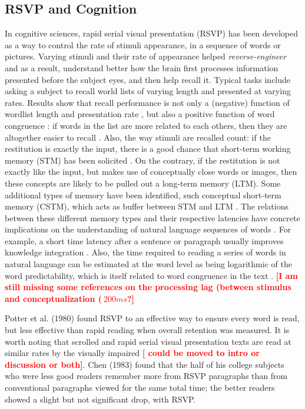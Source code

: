\subsection{RSVP and Cognition}
In cognitive sciences, rapid serial visual presentation (RSVP) has been developed as a way to control the rate of stimuli appearance, in a sequence of words or pictures. Varying stimuli and their rate of appearance helped {\it reverse-engineer} and as a result, understand better how the brain first processes information presented before the subject eyes, and then help recall it. Typical tasks include asking a subject to recall world lists of varying length and presented at varying rates. Results show that recall performance is not only a (negative) function of wordlist length and presentation rate \cite{}, but also a positive function of word congruence \cite{}: if words in the list are more related to each others, then they are altogether easier to recall \cite{}. Also, the way stimuli are recalled count: if the restitution is exactly the input, there is a good chance that  short-term working memory (STM) has been solicited \cite{}. On the contrary, if the restitution is not exactly like the input, but makes use of conceptually close words or images, then these concepts are likely to be pulled out a long-term memory (LTM). Some additional types of memory have been identified, such conceptual short-term memory (CSTM), which acts as buffer between STM and LTM \cite{potter1993very}. The relations between these different memory types and their respective latencies have concrete implications on the understanding of natural language sequences of words \cite{potter1984rapid}. For example, a short time latency after a sentence or paragraph usually improves knowledge integration \cite{see review by potter}. Also, the time required to reading a series of words in natural language can be estimated at the word level as being logarithmic of the word predictability, which is itself related to word congruence in the text \cite{smith2013effect}. \textcolor{red}{\bf [I am still missing some references on the processing lag (between stimulus and conceptualization ($~200ms$?]}

Potter et al. (1980) found RSVP to an effective way to ensure every word is read, but less effective than rapid reading when overall retention was measured. It is worth noting that scrolled and rapid serial visual presentation texts are read at similar rates by the visually impaired \cite{fine1995scrolled} \textcolor{red}{\bf [ could be moved to intro or discussion or both]}. Chen (1983) found that the half of his college subjects who were less good readers remember more from RSVP paragraphs than from conventional paragraphs viewed for the same total time; the better readers showed a slight but not significant drop, with RSVP.

